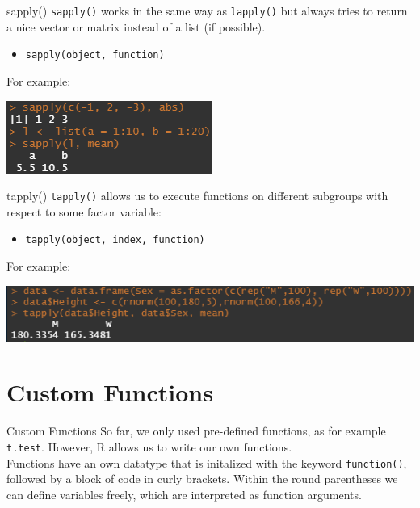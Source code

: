 \documentclass[aspectratio = 169]{chariteBeamer}
\begin{document}
\begin{frame}[fragile]{sapply()}
	\verb+sapply()+ works in the same way as \verb+lapply()+ but always tries to return a nice vector or matrix instead of a list (if possible).
	\begin{itemize}
		\item \verb+sapply(object, function)+
	\end{itemize}
	For example:\\
	\begin{center}
		\includegraphics{sapply}
	\end{center}
\end{frame}

\begin{frame}[fragile]{tapply()}
	\verb+tapply()+ allows us to execute functions on different subgroups with respect to some factor variable:
	\begin{itemize}
		\item \verb+tapply(object, index, function)+
	\end{itemize}
	For example:\\
	\begin{center}
		\includegraphics{tapply}
	\end{center}
\end{frame}

\section{Custom Functions}

\begin{frame}[fragile]{Custom Functions}
    So far, we only used pre-defined functions, as for example \verb+t.test+. However, \textsf R allows us to write our own functions. \bigskip \\
Functions have an own datatype that is initalized with the keyword \verb+function()+, followed by a block of code in curly brackets. Within the round parentheses we can define variables freely, which are interpreted as function arguments.
\end{frame}
\end{document}
